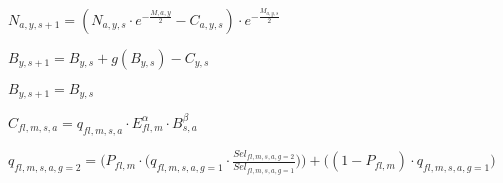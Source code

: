 \documentclass[multi={mymath},border=1pt]{standalone}
\newenvironment{mymath}{$\displaystyle}{$}
\begin{document}
\begin{mymath}
N_{a,y,s+1} = \left(N_{a,y,s} \cdot e^{-\frac{M{,a,y}}{2}} - C_{a,y,s}\right)\cdot
	e^{-\frac{M_{a,y,s}}{2}}
\end{mymath}

\begin{mymath}
B_{y,s+1} = B_{y,s} + g\left(B_{y,s}\right) - C_{y,s}
\end{mymath}

\begin{mymath}
B_{y,s+1} = B_{y,s} 
\end{mymath}

\begin{mymath}
C_{fl,m,s,a} = q_{fl,m,s,a} \cdot E_{fl,m}^{\alpha} \cdot B_{s,a}^{\beta}
\end{mymath}


\begin{mymath}
q_{fl,m,s,a,g=2} = \bigg( P_{fl,m} \cdot \big( q_{fl,m,s,a,g=1} \cdot
\frac{Sel_{fl,m,s,a,g=2}}{Sel_{fl,m,s,a,g=1}}\big) \bigg) + \bigg( \left(1 -
	P_{fl,m}
\right) \cdot q_{fl,m,s,a,g=1} \bigg)
\end{mymath}




\end{document}
